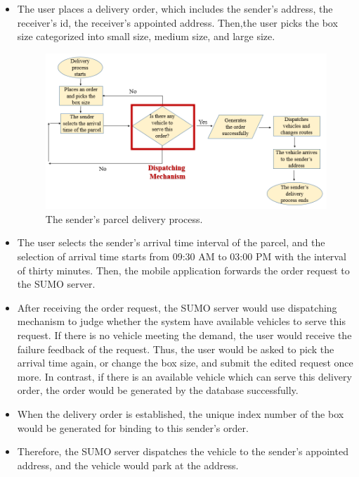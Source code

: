 \documentclass[12pt]{ksthesis}
\begin{document}
\begin{thesis}
{\begin{itemize}
\item
The user places a delivery order, which includes the sender’s address, the receiver’s id, the receiver’s appointed address. Then,the user picks the box size categorized into small size, medium size, and large size.


\begin{figure}[H]
\centering
\includegraphics[width=1.0\textwidth]{./Thesis_figures/F5-1_sender_delivery_process.PNG}
\caption{\large The sender’s parcel delivery process.}
\vspace{0.5cm}
\label{Fig:sender_process}
\end{figure}


\item
The user selects the sender’s arrival time interval of the parcel, and the selection of arrival time starts from 09:30 AM to 03:00 PM with the interval of thirty minutes. Then, the mobile application forwards the order request to the SUMO server.

\item
After receiving the order request, the SUMO server would use dispatching mechanism to judge whether the system have available vehicles to serve this request. If there is no vehicle meeting the demand, the user would receive the failure feedback of the request. Thus, the user would be asked to pick the arrival time again, or change the box size, and submit the edited request once more.
In contrast, if there is an available vehicle which can serve this delivery order, the order would be generated by the database successfully.

\item
When the delivery order is established, the unique index number of the box would be generated for binding to this sender’s order.

\item
Therefore, the SUMO server dispatches the vehicle to the sender’s appointed address, and the vehicle would park at the address.


\end{itemize}}
\end{thesis}
\end{document}
